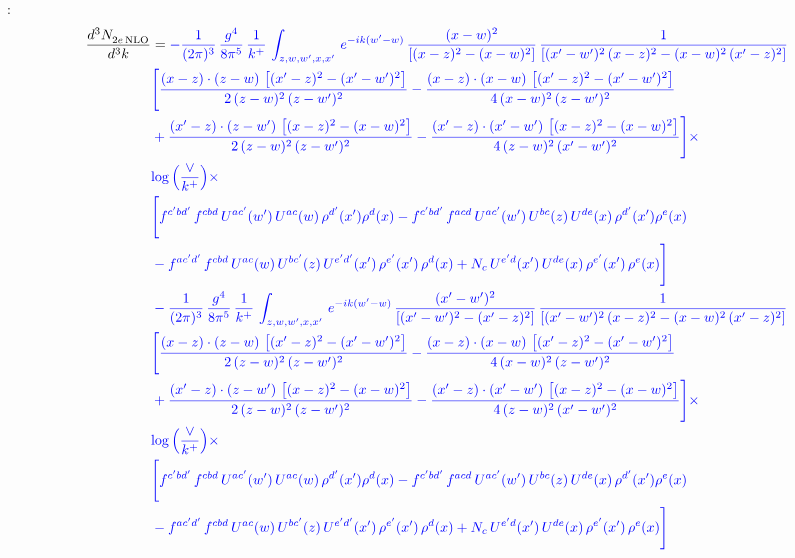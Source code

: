 \documentclass[10pt]{article}
\numberwithin{equation}{section}
\newcommand{\new}[1]{{\color{blue}#1}}
\newcommand{\nc}{\color{blue}}
\begin{document}
\noindent \new{From \texttt{Other\_terms.tex}}:
\begin{align}
 \frac{d^{3}N_{2e\,\rm NLO}^{\rm}}{d^{3}k}  & =   \nc -\frac{1}{(2\pi)^{3}}\, \frac{g^{4}}{8\pi^{5}}\,\frac{1}{k^{+}}\,\int_{z,w,w^{\prime},x,x'}\, e^{-ik(w^{\prime}-w)}\,\frac{(x-w)^{2}}{\left[(x-z)^{2}-(x-w)^{2}\right]}\, \frac{1}{\left[(x'-w')^{2}\, (x-z)^{2} - (x-w)^{2}\, (x'-z)^{2}\right]} \notag \\ & \nc  \Bigg[\frac{(x-z)\cdot (z-w)\, \left[(x'-z)^{2}-(x'-w')^{2}\right]}{2\, (z-w)^{2}\, (z-w')^{2}}  - \frac{(x-z)\cdot (x-w)\,\left[(x'-z)^{2}-(x'-w')^{2}\right] }{4\,(x-w)^{2}\,(z-w')^{2}}\notag \\ & \nc  +\frac{(x'-z)\cdot (z-w')\, \left[(x-z)^{2}-(x-w)^{2}\right]}{2\, (z-w)^{2}\, (z-w')^{2}}-\frac{(x'-z)\cdot (x'-w')\, \left[(x-z)^{2}-(x-w)^{2}\right]}{4\, (z-w)^{2}\,(x'-w')^{2}}\Bigg]\times\,\notag \\ & \nc  \new{\log{\left(\frac{\vee}{k^{+}}\right)}}\times\,\notag \\ & \nc  \Bigg[f^{c'bd'}\,f^{cbd}\, U^{ac'}(w')\,U^{ac}(w)\,\rho^{d'}(x')\rho^{d}(x)- f^{c'bd'}\,f^{acd}\,U^{ac'}(w')\,U^{bc}(z)\,U^{de}(x)\,\rho^{d'}(x')\rho^{e}(x) \notag \\ & \nc  -f^{ac'd'}\,f^{cbd}\,U^{ac}(w)\,U^{bc'}(z)\,U^{e'd'}(x')\,\rho^{e'}(x')\,\rho^{d}(x) +N_{c}\,U^{e'd}(x')\,U^{de}(x)\,\rho^{e'}(x')\,\rho^{e}(x)\Bigg] \notag \\
& \nc  -\frac{1}{(2\pi)^{3}}\, \frac{g^{4}}{8\pi^{5}}\,\frac{1}{k^{+}}\,\int_{z,w,w^{\prime},x,x'}\, e^{-ik(w^{\prime}-w)}\, \frac{(x'-w')^{2}}{\left[(x'-w')^{2}-(x'-z)^{2}\right]}\, \frac{1}{\left[(x'-w')^{2}\, (x-z)^{2} - (x-w)^{2}\, (x'-z)^{2}\right]}  \notag \\ & \nc  \Bigg[\frac{(x-z)\cdot (z-w)\, \left[(x'-z)^{2}-(x'-w')^{2}\right]}{2\, (z-w)^{2}\, (z-w')^{2}}  - \frac{(x-z)\cdot (x-w)\,\left[(x'-z)^{2}-(x'-w')^{2}\right] }{4\,(x-w)^{2}\,(z-w')^{2}}\notag \\ & \nc  +\frac{(x'-z)\cdot (z-w')\, \left[(x-z)^{2}-(x-w)^{2}\right]}{2\, (z-w)^{2}\, (z-w')^{2}}-\frac{(x'-z)\cdot (x'-w')\, \left[(x-z)^{2}-(x-w)^{2}\right]}{4\, (z-w)^{2}\,(x'-w')^{2}}\Bigg]\times\,\notag \\ & \nc  \new{\log{\left(\frac{\vee}{k^{+}}\right)}}\times\notag \\ & \nc  \Bigg[f^{c'bd'}\,f^{cbd}\, U^{ac'}(w')\,U^{ac}(w)\,\rho^{d'}(x')\rho^{d}(x)- f^{c'bd'}\,f^{acd}\,U^{ac'}(w')\,U^{bc}(z)\,U^{de}(x)\,\rho^{d'}(x')\rho^{e}(x) \notag \\ & \nc  -f^{ac'd'}\,f^{cbd}\,U^{ac}(w)\,U^{bc'}(z)\,U^{e'd'}(x')\,\rho^{e'}(x')\,\rho^{d}(x) +N_{c}\,U^{e'd}(x')\,U^{de}(x)\,\rho^{e'}(x')\,\rho^{e}(x)\Bigg] \label{eq:Bnew:G2I2e}
\end{align}
\end{document}
